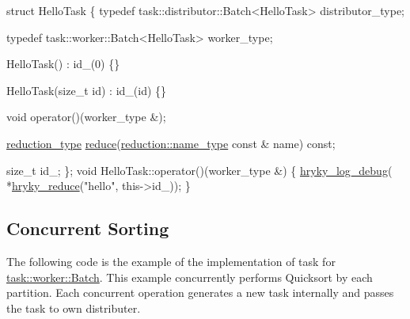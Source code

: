 \begin{DoxyCodeInclude}
    \textcolor{keyword}{struct }HelloTask
    \{
        \textcolor{keyword}{typedef} task::distributor::Batch<HelloTask>
            distributor\_type;
        
        \textcolor{keyword}{typedef} task::worker::Batch<HelloTask>
            worker\_type;
        
        HelloTask() : id\_(0) \{\}
        
        HelloTask(\textcolor{keywordtype}{size\_t} \textcolor{keywordtype}{id}) : id\_(id) \{\}

        \textcolor{keywordtype}{void} operator()(worker\_type &);

        \hyperlink{namespacehryky_a343a9a4c36a586be5c2693156200eadc}{reduction_type} \hyperlink{namespacehryky_af41cb3af6766761da0ff21b84527a52c}{reduce}(\hyperlink{namespacehryky_1_1reduction_ac686c30a4c8d196bbd0f05629a6b921f}{reduction::name_type} \textcolor{keyword}{const} & name) \textcolor{keyword}{const};

        \textcolor{keywordtype}{size\_t} id\_;
    \};
\textcolor{keywordtype}{void} HelloTask::operator()(worker\_type &)
\{
    \hyperlink{log__writer__common_8h_ad94e7301fdfeec6ecd1cb63b4c81325a}{hryky_log_debug}(
        *\hyperlink{reduction__common_8h_afc72326c9900838c5db40438318794dd}{hryky_reduce}(\textcolor{stringliteral}{"hello"}, this->id\_));
\}

\end{DoxyCodeInclude}
\hypertarget{hryky_1_1task_QuicksortTask}{}\subsection{Concurrent Sorting}\label{hryky_1_1task_QuicksortTask}
The following code is the example of the implementation of task for \hyperlink{classhryky_1_1task_1_1worker_1_1_batch}{task\-::worker\-::\-Batch}. This example concurrently performs Quicksort by each partition. Each concurrent operation generates a new task internally and passes the task to own distributer.




